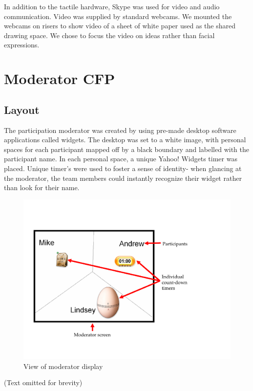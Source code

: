 In addition to the tactile hardware, Skype was used for video and audio communication. Video was supplied by standard webcams. We mounted the webcams on risers to show video of a sheet of white paper used as the shared drawing space. We chose to focus the video on ideas rather than facial expressions. 


\clearpage
\section{Moderator CFP}

\subsection{Layout}

The participation moderator was created by using pre-made desktop software applications called widgets. The desktop was set to a white image, with personal spaces for each participant mapped off by a black boundary and labelled with the participant name. In each personal space, a unique Yahoo! Widgets timer was placed. Unique timer's were used to foster a sense of identity- when glancing at the moderator, the team members could instantly recognize their widget rather than look for their name. 

\begin{figure}[htbp]
	\centering
		\includegraphics[width=1.00\textwidth]{Figures/Ch5/moderator.pdf}
	\caption{View of moderator display}
	\label{fig:moderator}
\end{figure}

\begin{center}
\color{blue}
(Text omitted for brevity)
\normalcolor
\end{center}


